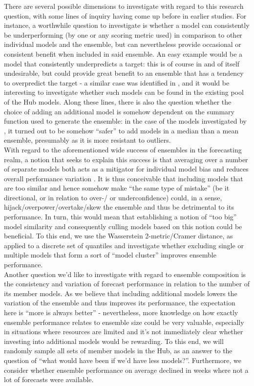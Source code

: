 There are several possible dimensions to investigate with regard to this research question, with some lines of inquiry having come up before in earlier studies. For instance, a worthwhile question to investigate is whether a model can consistently be underperforming (by one or any scoring metric used) in comparison to other individual models and the ensemble, but can nevertheless provide occasional or consistent benefit when included in said ensemble. An easy example would be a model that consistently underpredicts a target: this is of course in and of itself undesirable, but could provide great benefit to an ensemble that has a tendency to overpredict the target - a similar case was identified in \cite{bosse_comparing_2021}, and it would be interesting to investigate whether such models can be found in the existing pool of the Hub models. Along these lines, there is also the question whether the choice of adding an additional model is somehow dependent on the summary function used to generate the ensemble: in the case of the models investigated by \cite{bosse_comparing_2021}, it turned out to be somehow ``safer'' to add models in a median than a mean ensemble, presumably as it is more resistant to outliers. \\
With regard to the aforementioned wide success of ensembles in the forecasting realm, a notion that seeks to explain this success is that averaging over a number of separate models both acts as a mitigator for individual model bias and reduces overall performance variation . It is thus conceivable that including models that are too similar and hence somehow make ``the same type of mistake'' (be it directional, or in relation to over-/ or underconfidence) could, in a sense, hijack/overpower/overtake/skew the ensemble and thus be detrimental to its performance. In turn, this would mean that establishing a notion of ``too big''  model similarity and consequently culling models based on this notion could be beneficial. To this end, we use the Wasserstein 2-metric/Cramer distance, as applied to a discrete set of quantiles and investigate whether excluding single or multiple models that form a sort of ``model cluster'' improves ensemble performance. \\
Another question we'd like to investigate with regard to ensemble composition is the consistency and variation of forecast performance in relation to the number of its member models. As we believe that including additional models lowers the variation of the ensemble and thus improves its performance, the expectation here is ``more is always better'' - nevertheless, more knowledge on how exactly ensemble performance relates to ensemble size could be very valuable, especially in situations where resources are limited and it's not immediately clear whether investing into additional models would be rewarding. To this end, we will randomly sample all sets of member models in the Hub, as an answer to the question of ``what would have been if we'd have less models?''. Furthermore, we consider whether ensemble performance on average declined in weeks where not a lot of forecasts were available.\\
